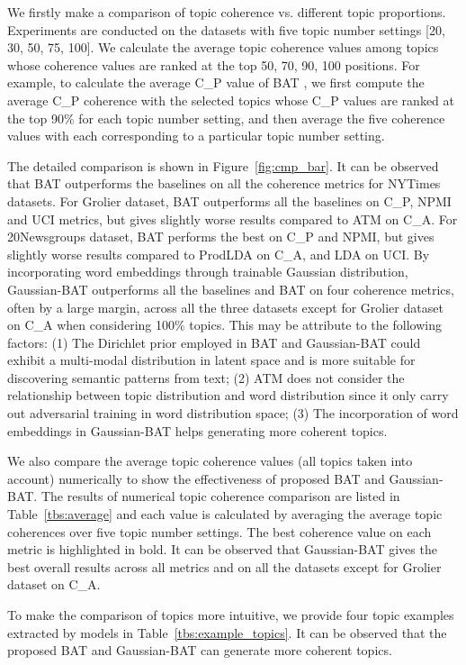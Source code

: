 \documentclass[11pt,a4paper]{article}
\begin{document}
We firstly make a comparison of topic coherence vs. different topic proportions. Experiments are conducted on the datasets with five topic number settings [20, 30, 50, 75, 100]. We calculate the average topic coherence values among topics whose coherence values are ranked at the top 50, 70, 90, 100 positions. For example, to calculate the average C\_P value of BAT , {\color{black}we first compute the average C\_P coherence with the selected topics whose C\_P values are ranked at the top 90\% for each topic number setting, and then average the five coherence values with each corresponding to a particular topic number setting.}

{\color{black}The detailed comparison is shown in Figure~\ref{fig:cmp_bar}}. {\color{black}It can be observed that BAT outperforms the baselines on all the coherence metrics for NYTimes datasets. For Grolier dataset, BAT outperforms all the baselines on C\_P, NPMI and UCI metrics, but gives slightly worse results compared to ATM on C\_A. For 20Newsgroups dataset, BAT performs the best on C\_P and NPMI, but gives slightly worse results compared to ProdLDA on C\_A, and LDA on UCI. 
By incorporating word embeddings through trainable Gaussian distribution, Gaussian-BAT outperforms all the baselines and BAT on four coherence metrics, often by a large margin, across all the three datasets except for Grolier dataset on C\_A when considering 100\% topics. This may be attribute to the following factors: (1) The Dirichlet prior employed in BAT and Gaussian-BAT could exhibit a multi-modal distribution in latent space and is more suitable for discovering semantic patterns from text; (2) ATM does not consider the relationship between topic distribution and word distribution since it only carry out adversarial training in word distribution space;  (3) The incorporation of word embeddings in Gaussian-BAT helps generating more coherent topics.}

We also compare the average topic coherence values (all topics taken into account) numerically to show the effectiveness of proposed BAT and Gaussian-BAT. The results of numerical topic coherence comparison are listed in Table~\ref{tbs:average} and each value is calculated by averaging the average topic coherences over five topic number settings. 
The best coherence value on each metric is highlighted in bold. It can be observed that Gaussian-BAT gives the best overall results across all metrics and on all the datasets except for Grolier dataset on C\_A. {\color{black} To make the comparison of topics more intuitive, we provide four topic examples extracted by models in Table~\ref{tbs:example_topics}. {\color{black}It can be observed that the proposed BAT and Gaussian-BAT can generate more coherent topics.} 


}
\end{document}

